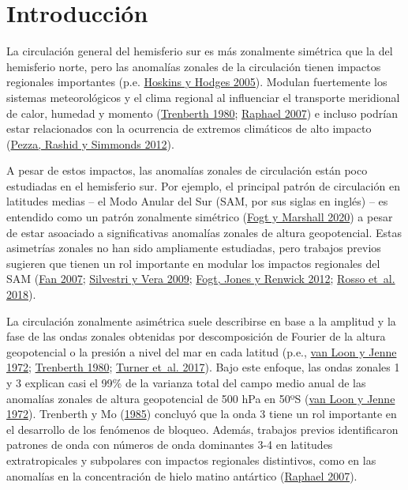\documentclass[12pt,oneside,a4paper]{reedthesis}
\begin{document}
\hypertarget{intro}{%
\chapter{Introducción}\label{intro}}

La circulación general del hemisferio sur es más zonalmente simétrica que la del hemisferio norte, pero las anomalías zonales de la circulación tienen impactos regionales importantes (p.e. \protect\hyperlink{ref-hoskins2005}{Hoskins y Hodges 2005}).
Modulan fuertemente los sistemas meteorológicos y el clima regional al influenciar el transporte meridional de calor, humedad y momento (\protect\hyperlink{ref-trenberth1980a}{Trenberth 1980}; \protect\hyperlink{ref-raphael2007}{Raphael 2007}) e incluso podrían estar relacionados con la ocurrencia de extremos climáticos de alto impacto (\protect\hyperlink{ref-pezza2012}{Pezza, Rashid y Simmonds 2012}).

A pesar de estos impactos, las anomalías zonales de circulación están poco estudiadas en el hemisferio sur.
Por ejemplo, el principal patrón de circulación en latitudes medias -- el Modo Anular del Sur (SAM, por sus siglas en inglés) -- es entendido como un patrón zonalmente simétrico (\protect\hyperlink{ref-fogt2020}{Fogt y Marshall 2020}) a pesar de estar asoaciado a significativas anomalías zonales de altura geopotencial.
Estas asimetrías zonales no han sido ampliamente estudiadas, pero trabajos previos sugieren que tienen un rol importante en modular los impactos regionales del SAM (\protect\hyperlink{ref-fan2007}{Fan 2007}; \protect\hyperlink{ref-silvestri2009}{Silvestri y Vera 2009}; \protect\hyperlink{ref-fogt2012}{Fogt, Jones y Renwick 2012}; \protect\hyperlink{ref-rosso2018}{Rosso et~al. 2018}).

La circulación zonalmente asimétrica suele describirse en base a la amplitud y la fase de las ondas zonales obtenidas por descomposición de Fourier de la altura geopotencial o la presión a nivel del mar en cada latitud (p.e., \protect\hyperlink{ref-vanloon1972}{van Loon y Jenne 1972}; \protect\hyperlink{ref-trenberth1980a}{Trenberth 1980}; \protect\hyperlink{ref-turner2017}{Turner et~al. 2017}).
Bajo este enfoque, las ondas zonales 1 y 3 explican casi el 99\% de la varianza total del campo medio anual de las anomalías zonales de altura geopotencial de 500 hPa en 50ºS (\protect\hyperlink{ref-vanloon1972}{van Loon y Jenne 1972}).
Trenberth y Mo (\protect\hyperlink{ref-trenberth1985}{1985}) concluyó que la onda 3 tiene un rol importante en el desarrollo de los fenómenos de bloqueo.
Además, trabajos previos identificaron patrones de onda con números de onda dominantes 3-4 en latitudes extratropicales y subpolares con impactos regionales distintivos, como en las anomalías en la concentración de hielo matino antártico (\protect\hyperlink{ref-raphael2007}{Raphael 2007}).
\end{document}

